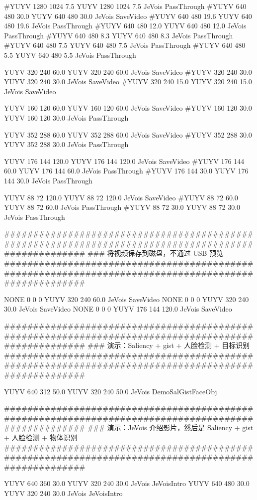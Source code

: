 \begin{DoxyVerb}
#YUYV 1280 1024 7.5 YUYV 1280 1024 7.5 JeVois PassThrough
#YUYV 640 480 30.0 YUYV 640 480 30.0 JeVois SaveVideo
#YUYV 640 480 19.6 YUYV 640 480 19.6 JeVois PassThrough
#YUYV 640 480 12.0 YUYV 640 480 12.0 JeVois PassThrough
#YUYV 640 480 8.3 YUYV 640 480 8.3 JeVois PassThrough
#YUYV 640 480 7.5 YUYV 640 480 7.5 JeVois PassThrough
#YUYV 640 480 5.5 YUYV 640 480 5.5 JeVois PassThrough

YUYV 320 240 60.0 YUYV 320 240 60.0 JeVois SaveVideo
#YUYV 320 240 30.0 YUYV 320 240 30.0 JeVois SaveVideo
#YUYV 320 240 15.0 YUYV 320 240 15.0 JeVois SaveVideo

YUYV 160 120 60.0 YUYV 160 120 60.0 JeVois SaveVideo
#YUYV 160 120 30.0 YUYV 160 120 30.0 JeVois PassThrough

YUYV 352 288 60.0 YUYV 352 288 60.0 JeVois SaveVideo
#YUYV 352 288 30.0 YUYV 352 288 30.0 JeVois PassThrough

YUYV 176 144 120.0 YUYV 176 144 120.0 JeVois SaveVideo
#YUYV 176 144 60.0 YUYV 176 144 60.0 JeVois PassThrough
#YUYV 176 144 30.0 YUYV 176 144 30.0 JeVois PassThrough

YUYV 88 72 120.0 YUYV 88 72 120.0 JeVois SaveVideo
#YUYV 88 72 60.0 YUYV 88 72 60.0 JeVois PassThrough
#YUYV 88 72 30.0 YUYV 88 72 30.0 JeVois PassThrough

#################################################################################################### 
### 将视频保存到磁盘，不通过 USB 预览 
####################################################################################################

NONE 0 0 0 YUYV 320 240 60.0 JeVois SaveVideo
NONE 0 0 0 YUYV 320 240 30.0 JeVois SaveVideo
NONE 0 0 0 YUYV 176 144 120.0 JeVois SaveVideo

####################################################################################################
### 演示：Saliency + gist + 人脸检测 + 目标识别 
####################################################################################################

YUYV 640 312 50.0 YUYV 320 240 50.0 JeVois DemoSalGistFaceObj

####################################################################################################
### 演示：JeVois 介绍影片，然后是 Saliency + gist + 人脸检测 + 物体识别 
####################################################################################################

YUYV 640 360 30.0 YUYV 320 240 30.0 JeVois JeVoisIntro
YUYV 640 480 30.0 YUYV 320 240 30.0 JeVois JeVoisIntro


\end{DoxyVerb}

